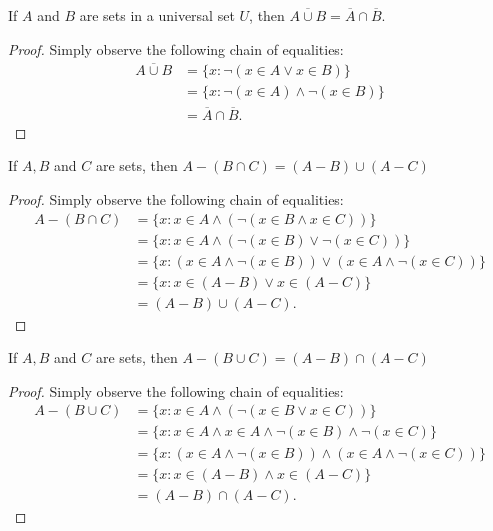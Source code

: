 \documentclass{exam}
\begin{document}
\begin{proposition}{8.11}
    If $A$ and $B$ are sets in a universal set $U$, then $\overline{A\cup B}=\overline A\cap\overline B$.
\end{proposition}

\begin{proof}
    Simply observe the following chain of equalities:
    \begin{align*}
        \overline{A\cup B}&=\{x:\lnot(x\in A\lor x\in B)\}\\
        &=\{x:\lnot(x\in A)\land\lnot(x\in B)\}\\
        &=\overline A\cap\overline B.
    \end{align*}
\end{proof}

\begin{proposition}{8.12}
    If $A, B$ and $C$ are sets, then $A-(B\cap C)=(A-B)\cup(A-C)$
\end{proposition}

\begin{proof}
    Simply observe the following chain of equalities:
    \begin{align*}
        A-(B\cap C)&=\{x:x\in A\land(\lnot(x\in B\land x\in C))\}\\
        &=\{x:x\in A\land(\lnot(x\in B)\lor\lnot(x\in C))\}\\
        &=\{x:(x\in A\land\lnot(x\in B))\lor(x\in A\land\lnot(x\in C))\}\\
        &=\{x:x\in(A - B)\lor x\in(A- C)\}\\
        &= (A-B)\cup(A-C).
    \end{align*}
\end{proof}

\begin{proposition}{8.13}
    If $A, B$ and $C$ are sets, then $A-(B\cup C)=(A-B)\cap(A-C)$
\end{proposition}

\begin{proof}
    Simply observe the following chain of equalities:
    \begin{align*}
        A-(B\cup C)&=\{x:x\in A\land(\lnot(x\in B\lor x\in C))\}\\
        &=\{x:x\in A\land x\in A\land\lnot(x\in B)\land\lnot(x\in C)\}\\
        &=\{x:(x\in A\land\lnot(x\in B))\land(x\in A\land\lnot(x\in C))\}\\
        &=\{x:x\in(A - B)\land x\in(A- C)\}\\
        &= (A-B)\cap(A-C).
    \end{align*}
\end{proof}
\end{document}
